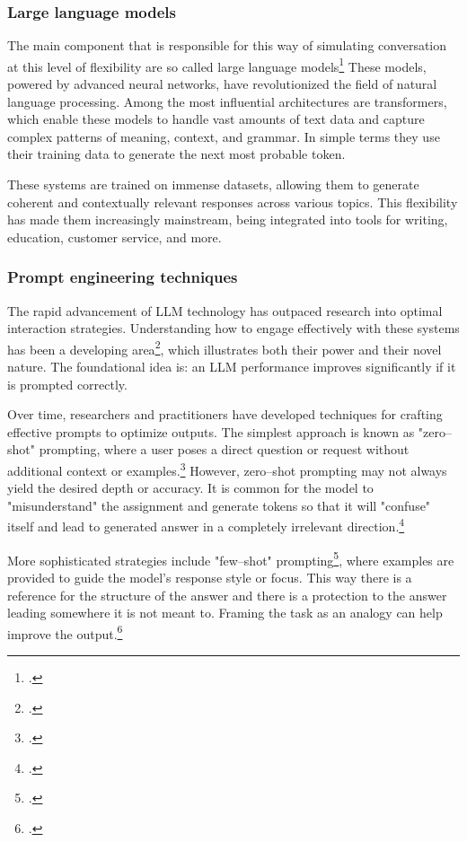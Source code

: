 \documentclass[12pt]{report}
\begin{document}
{\subsubsection{Large language models}

The main component that is responsible for
this way of simulating conversation at this level of flexibility
are so called large language models\footcite{naveed2023comprehensive}
These models, powered by advanced neural networks,
have revolutionized the field of natural language processing.
Among the most influential architectures are transformers,
which enable these models to handle
vast amounts of text data and capture complex patterns of meaning, context, and grammar.
In simple terms they use their training data to generate the next most probable token.

These systems are trained on immense datasets,
allowing them to generate coherent and contextually relevant responses across various topics.
This flexibility has made them increasingly mainstream,
being integrated into tools for writing, education, customer service, and more.

\subsubsection{Prompt engineering techniques}

The rapid advancement of LLM technology
has outpaced research into optimal interaction strategies.
Understanding how to engage effectively
with these systems has been a developing area\footcite{sahoo2024systematic},
which illustrates both their power and their novel nature.
The foundational idea is:
an LLM performance improves significantly if it is prompted correctly.

Over time, researchers and practitioners have developed techniques for
crafting effective prompts to optimize outputs.
The simplest approach is known as "zero–shot" prompting,
where a user poses a direct question or request without additional context or examples.\footcite{kong2023better,li2023practical}
However, zero–shot prompting may not always yield the desired depth or accuracy.
It is common for the model to "misunderstand" the assignment
and generate tokens so that it will "confuse" itself
and lead to generated answer in a completely irrelevant direction.\footcite{hwang2025llms}

More sophisticated strategies include "few–shot" prompting\footcite{yao2023more},
where examples are provided to guide the model's response style or focus.
This way there is a reference for the structure of the answer
and there is a protection to the answer leading somewhere it is not meant to.
Framing the task as an analogy can help improve the output.\footcite{stevenson2024can, qin2024relevant}

}
\end{document}
